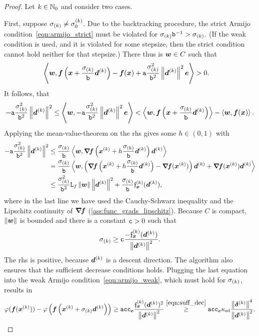 \documentclass{article}
\theoremstyle{plain}
\theoremstyle{definition}
\begin{document}
\begin{proof}
	Let $k\in\mathbb N_0$ and consider two cases.

	First, suppose $\sigma_{(k)}\ne\sigma^{(k)}_{0}$.
	Due to the backtracking procedure, the strict Armijo condition~\eqref{eqn:armijo_strict}
	must be violated for $\sigma_{(k)} \mathtt{b}^{-1} > \sigma_{(k)}$.
	(If the weak condition is used, and it is violated for some stepsize, then the strict
	condition cannot hold neither for that stepsize.)
	There thus is $\bm{w}\in C$ such that 
	\begin{align*}
		\left\langle 
			\bm{w}
		, 
			\bm{f}\left(\bm{x} + \frac{\sigma_{(k)}}{\mathtt{b}}\bm{d}^{(k)}\right)
			-
			\bm{f}(\bm{x})
			+ 
			\mathtt{a} \frac{\sigma_{(k)}^2}{\mathtt{b}^2} \left\|\bm{d}^{(k)}\right\|^2 \bm{e}
		 \right\rangle
	&
	> 
		0.
	\end{align*}
	It follows, that
	\begin{align*}
	-\armijoConst \frac{\szK^2}{\armijoFactor^2} \norm{\vdK}^2
	\leq
	\mul{
		\ve w
	}{
		-\armijoConst \frac{\szK^2}{\armijoFactor^2} \norm{\vdK}^2 \ve{e}
	}
	<
	\mul{
			\ve w
		}{
			\vf\args{\vx + \frac{\szK}{\armijoFactor}\vdK}
		}
		-
		\mul{
			\ve w
		}{%
			\vf(\vx)
		}.
	\end{align*}
	Applying the mean-value-theorem on the \ac{rhs}
	gives some 
	$h \in (0,1)$ with
	\begin{align*}	
		-\mathtt{a} \frac{\sigma_{(k)}^2}{\mathtt{b}^2} \left\|\bm{d}^{(k)}\right\|^2
		&\leq
		\frac{\sigma_{(k)}}{\mathtt{b}}
		\left\langle 
			\bm{w}
		, 
			\bm{\nabla}\!\bm{f}\left(\bm{x}^{(k)} + h \frac{\sigma_{(k)}}{\mathtt{b}}\bm{d}^{(k)}\right)\bm{d}^{(k)}
		 \right\rangle
		\\
		&=
		\frac{\sigma_{(k)}}{\mathtt{b}}
		\left\langle 
			\bm{w}
		, 
			\left(
				\bm{\nabla}\!\bm{f}\left(\bm{x}^{(k)} + h \frac{\sigma_{(k)}}{\mathtt{b}}\bm{d}^{(k)}\right)
				-
				\bm{\nabla}\!\bm{f}(\bm{x}^{(k)})
			\right)\bm{d}^{(k)}
			+ 
			\bm{\nabla}\!\bm{f}(\bm{x}^{(k)})\bm{d}^{(k)}
		 \right\rangle
		\\
		&\leq
		\frac{\sigma_{(k)}^2}{\mathtt{b}^2}
		\mathtt{L}_{f}
		\left\|\bm{w}\right\|\left\|\bm{d}^{(k)}\right\|^2 
		+ 
		\frac{\sigma_{(k)}}{\mathtt{b}}
		\mathfrak{f}_{\bm{x}}^{(k)}(\bm{d}^{(k)}),
	\end{align*}
	where in the last line we have used the Cauchy-Schwarz inequality
	and the Lipschitz continuity of $\bm{\nabla}\!\bm{f}$ (\cref{ass:func_grads_lipschitz}).
	Because $C$ is compact, $\left\|\bm{w}\right\|$ is bounded and there is a constant
	$\mathtt c > 0$ such that
	$$
	\sigma_{(k)}\ge \mathtt c \frac{-\mathfrak{f}_{\bm{x}}^{(k)}(\bm{d}^{(k)})}{\left\|\bm{d}^{(k)}\right\|^2}.
	$$
	The \ac{rhs} is positive, because $\bm{d}^{(k)}$ is a descent direction.
	The algorithm also ensures that the sufficient decrease conditions holds.
	Plugging the last equation into the weak Armijo condition~\eqref{eqn:armijo_weak},
	which must hold for $\sigma_{(k)}$, results in
	\begin{equation}	
	\varphi(\bm{f}(\bm{x}^{(k)}))
	-
	\varphi\left(\bm{f}\left(\bm{x}^{(k)}+\sigma_{(k)} \bm{d}^{(k)}\right)\right)
	\geq 
	\mathtt{a}
	\mathtt c
	\mathtt{c}_{\bm{e}}
	\frac{
		\mathfrak{f}_{\bm{x}}^{(k)}(\bm{d}^{(k)})^2
	}{
		\left\|\bm{d}^{(k)}\right\|^2
	}
	\stackrel{\eqref{eqn:suff_dec}}\geq
	\mathtt{a}
	\mathtt c
	\mathtt{c}_{\bm{e}}
	\kappa_{\mathrm{sd}}
	\frac{
		\left\|\bm{\delta}^{(k)}\right\|^4
	}{
		\left\|\bm{d}^{(k)}\right\|^2
	}.
	\label{eqn:untuningCreatrixes}
	\end{equation}


\end{proof}
\end{document}
